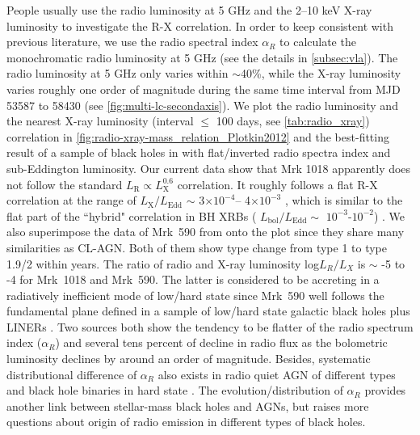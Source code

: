 \documentclass[twocolumn]{aastex63}
\begin{document}
People usually use the radio luminosity at 5 GHz and the 2--10 keV X-ray luminosity to investigate the R-X correlation. In order to keep consistent with previous literature, we use the radio spectral index $\alpha_R$ to calculate the monochromatic radio luminosity at 5 GHz (see the details in \autoref{subsec:vla}). The radio luminosity at 5 GHz only varies within $\sim$40\%, while the X-ray luminosity varies roughly one order of magnitude during the same time interval from MJD 53587 to 58430 (see \autoref{fig:multi-lc-secondaxis}). We plot the radio luminosity and the nearest X-ray luminosity (interval $\le$ 100 days, see \autoref{tab:radio_xray}) correlation in \autoref{fig:radio-xray-mass_relation_Plotkin2012} and the best-fitting result of a sample of black holes in \citet{2012MNRAS.419..267P} with flat/inverted radio spectra index and sub-Eddington luminosity. Our current data show that Mrk 1018 apparently does not follow the standard $L_\mathrm{R}\propto L_\mathrm{X}^{0.6}$ correlation. It roughly follows a flat R-X correlation at the range of $L_\mathrm{X}/L_\mathrm{Edd}$ $\sim$ 3$\times 10^{-4}$-- 4$\times 10^{-3}$ , which is similar to the flat part of the ``hybrid" correlation in BH XRBs ( $L_\mathrm{bol}/L_\mathrm{Edd} \sim$ $10^{-3}$-$10^{-2}$) \citep[see e.g.][]{2018MNRAS.473.4122E,2020ApJ...891...31X}. We also superimpose the data of Mrk~590 from \citet[][]{2016MNRAS.460..304K} onto the plot since they share many similarities as CL-AGN. Both of them show type change from type 1 to type 1.9/2 within years. The ratio of radio and X-ray luminosity log$L_R/L_X$ is $\sim$ -5 to -4 for Mrk~1018 and Mrk~590. The latter is considered to be accreting in a radiatively inefficient mode of low/hard state since Mrk~590 well follows the fundamental plane defined in a sample of low/hard state galactic black holes plus LINERs \citep[see discussion in ][]{2016MNRAS.460..304K}. Two sources both show the tendency to be flatter of the radio spectrum index ($\alpha_R$) and several tens percent of decline in radio flux as the bolometric luminosity declines by around an order of magnitude. Besides, systematic distributional difference of $\alpha_R$ also exists in radio quiet AGN of different types \citep[e.g.][]{2019MNRAS.485.3185C} and black hole binaries in hard state \citep[see][]{2018MNRAS.473.4122E}. The evolution/distribution of $\alpha_R$ provides another link between stellar-mass black holes and AGNs, but raises more questions about origin of radio emission in different types of black holes. 
\end{document}
